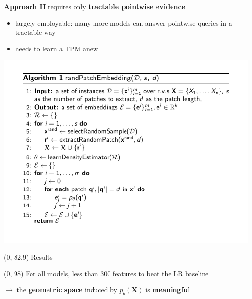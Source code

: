 \documentclass[final]{beamer}
\begin{document}
\begin{frame}{}
\begin{textblock}{25.2}
        \textbf{Approach II} requires only \textbf{tractable pointwise evidence}
        \begin{itemize}
        \item largely employable: many more models can answer pointwise
          queries in a tractable way
        \item needs to learn a TPM anew  
        \end{itemize}
        \begin{center}
          \includegraphics[width=0.9\linewidth]{algo_II}
        \end{center}
      \end{textblock}

      

      

      
  
  \begin{textblock}{80}(0, 82.9)
    Results
  \end{textblock}
  
  \begin{textblock}{25.2}(0, 98)
    \small
    For all models, less than $300$ features to beat the \textsf{LR}
    baseline\par
    \hspace{15pt}$\rightarrow$ the \textbf{geometric space} induced by $p_{\theta}(\mathbf{X})$ is \textbf{meaningful}
  \end{textblock}
  

\end{frame}
\end{document}
